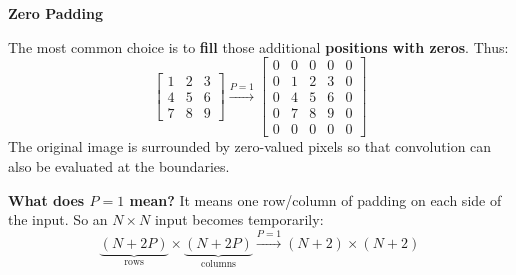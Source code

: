 \highspace
\begin{flushleft}
    \textcolor{Green3}{ \textbf{Zero Padding}}
\end{flushleft}
The most common choice is to \textbf{fill} those additional \textbf{positions with zeros}. Thus:
\begin{equation*}
    \begin{bmatrix}
        1 & 2 & 3 \\
        4 & 5 & 6 \\
        7 & 8 & 9
    \end{bmatrix}
    \xrightarrow{P = 1}
    \begin{bmatrix}
        0 & 0 & 0 & 0 & 0 \\
        0 & 1 & 2 & 3 & 0 \\
        0 & 4 & 5 & 6 & 0 \\
        0 & 7 & 8 & 9 & 0 \\
        0 & 0 & 0 & 0 & 0
    \end{bmatrix}
\end{equation*}
The original image is surrounded by zero-valued pixels so that convolution can also be evaluated at the boundaries.

\highspace
\textcolor{Green3}{ \textbf{What does $P=1$ mean?}} It means one row/column of padding on each side of the input. So an $N \times N$ input becomes temporarily:
\begin{equation*}
    \underbrace{\left(N + 2P\right)}_{\text{rows}} \times \underbrace{\left(N + 2P\right)}_{\text{columns}} \xrightarrow{P=1} (N + 2) \times (N + 2)
\end{equation*}

